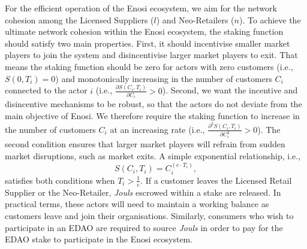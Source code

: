 \documentclass[a4paper,12pt,reqno]{amsart}
\theoremstyle{definition}
\begin{document}
For the efficient operation of the Enosi ecosystem, we aim for the network cohesion among the Licensed Suppliers ($l$) and Neo-Retailers ($n$). To achieve the ultimate network cohesion within the Enosi ecosystem, the staking function should satisfy two main properties. First, it should incentivise smaller market players to join the system and disincentivise larger market players to exit. That means the staking function should be zero for actors with zero customers (i.e., $S(0,T_i)=0$) and monotonically increasing in the number of customers $C_i$ connected to the actor $i$ (i.e., $\frac{\partial S(C_i,T_i)}{\partial C_i}>0$). Second, we want the incentive and disincentive mechanisms to be robust, so that the actors do not deviate from the main objective of Enosi. We therefore require the staking function to increase in the number of customers $C_i$ at an increasing rate (i.e., $\frac{\partial^2 S(C_i,T_i)}{\partial C_i^2}>0$). The second condition ensures that larger market players will refrain from sudden market disruptions, such as market exits. A simple exponential relationship, i.e.,
% 
% 
% 
% 
\begin{equation*}
S(C_i, T_i)=C_i^{(e\cdot T_i)}, 
\end{equation*}
satisfies both conditions when $T_i>\frac{1}{e}$. If a customer leaves the Licensed Retail Supplier or the Neo-Retailer, \textit{Jouls} escrowed within a stake are released. In practical terms, these actors will need to maintain a working balance as customers leave and join their organisations. Similarly, consumers who wish to participate in an EDAO are required to source \textit{Jouls} in order to pay for the EDAO stake to participate in the Enosi ecosystem.
\end{document}

